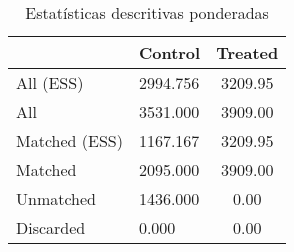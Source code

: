 \begin{table}

\caption{\label{tab:PSM}Estatísticas descritivas ponderadas}
\centering
\begin{tabular}[t]{llc}
\toprule
  & Control & Treated\\
\midrule
All (ESS) & 2994.756 & 3209.95\\
All & 3531.000 & 3909.00\\
Matched (ESS) & 1167.167 & 3209.95\\
Matched & 2095.000 & 3909.00\\
Unmatched & 1436.000 & 0.00\\
\addlinespace
Discarded & 0.000 & 0.00\\
\bottomrule
\end{tabular}
\end{table}
